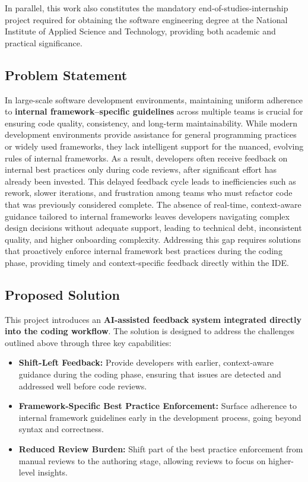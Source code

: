 \begin{spacing}{1.2}
In parallel, this work also constitutes the mandatory end-of-studies-internship project required for obtaining the software engineering degree at the National Institute of Applied Science and Technology, providing both academic and practical significance.  

\subsection{Problem Statement}
In large-scale software development environments, maintaining uniform adherence to \textbf{internal framework–specific guidelines} across multiple teams is crucial for ensuring code quality, consistency, and long-term maintainability. While modern development environments provide assistance for general programming practices or widely used frameworks, they lack intelligent support for the nuanced, evolving rules of internal frameworks. As a result, developers often receive feedback on internal best practices only during code reviews, after significant effort has already been invested. This delayed feedback cycle leads to inefficiencies such as rework, slower iterations, and frustration among teams who must refactor code that was previously considered complete. The absence of real-time, context-aware guidance tailored to internal frameworks leaves developers navigating complex design decisions without adequate support, leading to technical debt, inconsistent quality, and higher onboarding complexity. Addressing this gap requires solutions that proactively enforce internal framework best practices during the coding phase, providing timely and context-specific feedback directly within the IDE.  

\subsection{Proposed Solution}
This project introduces an \textbf{AI-assisted feedback system integrated directly into the coding workflow}. The solution is designed to address the challenges outlined above through three key capabilities:  

\begin{itemize}
    \item \textbf{Shift-Left Feedback:} Provide developers with earlier, context-aware guidance during the coding phase, ensuring that issues are detected and addressed well before code reviews.  
    \item \textbf{Framework-Specific Best Practice Enforcement:} Surface adherence to internal framework guidelines early in the development process, going beyond syntax and correctness.  
    \item \textbf{Reduced Review Burden:} Shift part of the best practice enforcement from manual reviews to the authoring stage, allowing reviews to focus on higher-level insights.  
\end{itemize}


\end{spacing}
